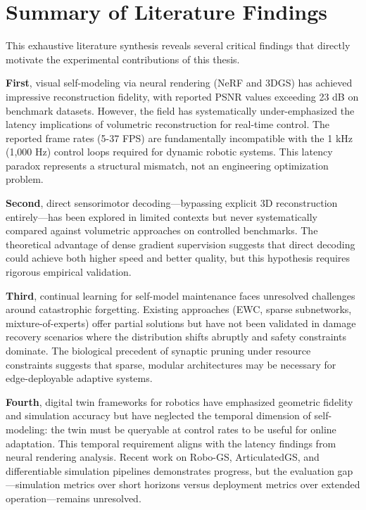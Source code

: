 \documentclass[12pt,a4paper,oneside]{report}
\begin{document}
\section{Summary of Literature Findings}

This exhaustive literature synthesis reveals several critical findings that directly motivate the experimental contributions of this thesis.

\textbf{First}, visual self-modeling via neural rendering (NeRF and 3DGS) has achieved impressive reconstruction fidelity, with reported PSNR values exceeding 23 dB on benchmark datasets. However, the field has systematically under-emphasized the latency implications of volumetric reconstruction for real-time control. The reported frame rates (5-37 FPS) are fundamentally incompatible with the 1 kHz (1,000 Hz) control loops required for dynamic robotic systems. This latency paradox represents a structural mismatch, not an engineering optimization problem.

\textbf{Second}, direct sensorimotor decoding---bypassing explicit 3D reconstruction entirely---has been explored in limited contexts but never systematically compared against volumetric approaches on controlled benchmarks. The theoretical advantage of dense gradient supervision suggests that direct decoding could achieve both higher speed and better quality, but this hypothesis requires rigorous empirical validation.

\textbf{Third}, continual learning for self-model maintenance faces unresolved challenges around catastrophic forgetting. Existing approaches (EWC, sparse subnetworks, mixture-of-experts) offer partial solutions but have not been validated in damage recovery scenarios where the distribution shifts abruptly and safety constraints dominate. The biological precedent of synaptic pruning under resource constraints suggests that sparse, modular architectures may be necessary for edge-deployable adaptive systems.

\textbf{Fourth}, digital twin frameworks for robotics have emphasized geometric fidelity and simulation accuracy but have neglected the temporal dimension of self-modeling: the twin must be queryable at control rates to be useful for online adaptation. This temporal requirement aligns with the latency findings from neural rendering analysis. Recent work on Robo-GS, ArticulatedGS, and differentiable simulation pipelines demonstrates progress, but the evaluation gap---simulation metrics over short horizons versus deployment metrics over extended operation---remains unresolved.
\end{document}

